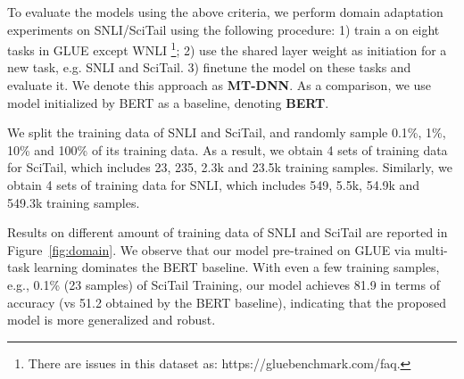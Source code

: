 To evaluate the models using the above criteria, we perform domain adaptation experiments on SNLI/SciTail using the following procedure: 1) train a {\MNAME} on eight tasks in GLUE except WNLI \footnote{There are issues in this dataset as: https://gluebenchmark.com/faq.}; 2) use the shared layer weight as initiation for a new task, e.g. SNLI and SciTail. 3) finetune the model on these tasks and evaluate it. We denote this approach as \textbf{MT-DNN}. As a comparison, we use model initialized by BERT as a baseline, denoting \textbf{BERT}.

We split the training data of SNLI and SciTail, and randomly sample 0.1\%, 1\%, 10\% and 100\% of its training data. As a result, we obtain 4 sets of training data for SciTail, which includes  23, 235, 2.3k and 23.5k training samples. Similarly, we obtain 4 sets of training data for SNLI, which includes 549, 5.5k, 54.9k and 549.3k training samples.

Results on different amount of training data of SNLI and SciTail are reported in Figure~\ref{fig:domain}. We observe that our model pre-trained on GLUE via multi-task learning dominates the BERT baseline. With even a few training samples, e.g., 0.1\% (23 samples) of SciTail Training, our model achieves 81.9 in terms of accuracy (vs 51.2 obtained by the BERT baseline), indicating that the proposed model is more generalized and robust.  

